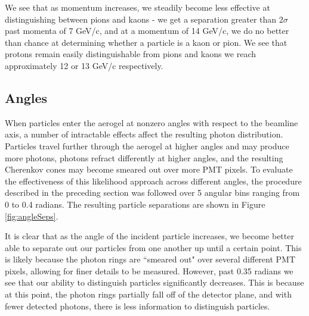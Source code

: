 We see that as momentum increases, we steadily become less effective at distinguishing between pions and kaons - we get a separation greater than $2 \sigma$ past momenta of 7 GeV/c, and at a momentum of 14 GeV/c, we do no better than chance at determining whether a particle is a kaon or pion.
We see that protons remain easily distinguishable from pions and kaons we reach approximately 12 or 13 GeV/c respectively. 

\subsection{Angles}
When particles enter the aerogel at nonzero angles with respect to the beamline axis, a number of intractable effects affect the resulting photon distribution. 
Particles travel further through the aerogel at higher angles and may produce more photons, photons refract differently at higher angles, and the resulting Cherenkov cones may become smeared out over more PMT pixels. 
To evaluate the effectiveness of this likelihood approach across different angles, the procedure described in the preceding section was followed over 5 angular bins ranging from 0 to 0.4 radians.
The resulting particle separations are shown in Figure \ref{fig:angleSeps}.

It is clear that as the angle of the incident particle increases, we become better able to separate out our particles from one another up until a certain point.
This is likely because the photon rings are ``smeared out" over several different PMT pixels, allowing for finer details to be measured. 
However, past 0.35 radians we see that our ability to distinguish particles significantly decreases.
This is because at this point, the photon rings partially fall off of the detector plane, and with fewer detected photons, there is less information to distinguish particles.

